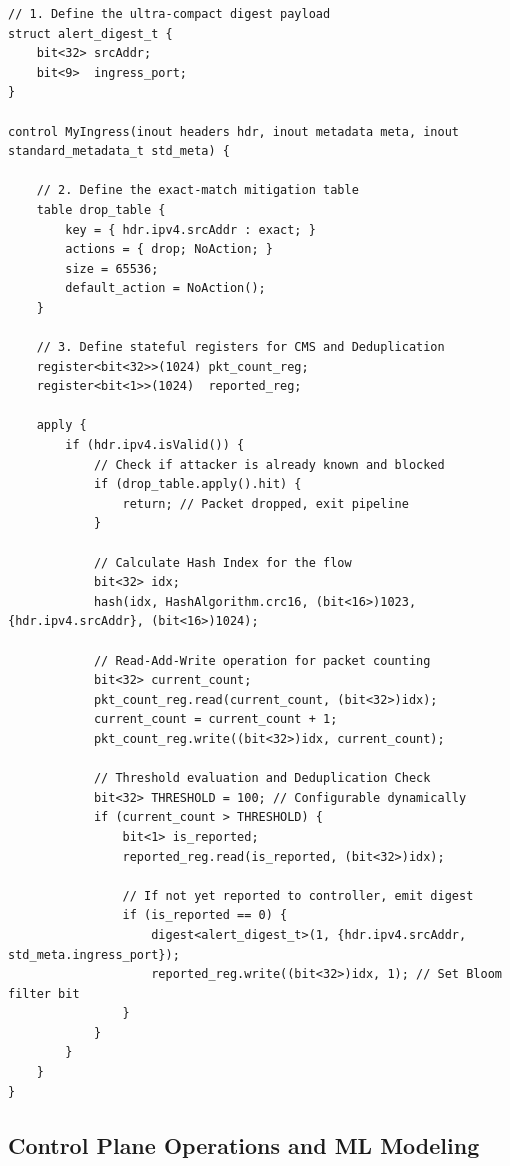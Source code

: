 \documentclass[sigconf, nonacm]{acmart}
\begin{document}
\begin{lstlisting}[caption={Updated P4-16 Implementation for Ingress Filtering, Sketch Accounting, and Digest Emission}, label={lst:p4code}, float=h]
// 1. Define the ultra-compact digest payload
struct alert_digest_t {
    bit<32> srcAddr;
    bit<9>  ingress_port;
}

control MyIngress(inout headers hdr, inout metadata meta, inout standard_metadata_t std_meta) {
    
    // 2. Define the exact-match mitigation table
    table drop_table {
        key = { hdr.ipv4.srcAddr : exact; }
        actions = { drop; NoAction; }
        size = 65536;
        default_action = NoAction();
    }

    // 3. Define stateful registers for CMS and Deduplication
    register<bit<32>>(1024) pkt_count_reg;
    register<bit<1>>(1024)  reported_reg;

    apply {
        if (hdr.ipv4.isValid()) {
            // Check if attacker is already known and blocked
            if (drop_table.apply().hit) {
                return; // Packet dropped, exit pipeline
            }

            // Calculate Hash Index for the flow
            bit<32> idx;
            hash(idx, HashAlgorithm.crc16, (bit<16>)1023, {hdr.ipv4.srcAddr}, (bit<16>)1024);

            // Read-Add-Write operation for packet counting
            bit<32> current_count;
            pkt_count_reg.read(current_count, (bit<32>)idx);
            current_count = current_count + 1;
            pkt_count_reg.write((bit<32>)idx, current_count);

            // Threshold evaluation and Deduplication Check
            bit<32> THRESHOLD = 100; // Configurable dynamically
            if (current_count > THRESHOLD) {
                bit<1> is_reported;
                reported_reg.read(is_reported, (bit<32>)idx);
                
                // If not yet reported to controller, emit digest
                if (is_reported == 0) {
                    digest<alert_digest_t>(1, {hdr.ipv4.srcAddr, std_meta.ingress_port});
                    reported_reg.write((bit<32>)idx, 1); // Set Bloom filter bit
                }
            }
        }
    }
}
\end{lstlisting}

\subsection{Control Plane Operations and ML Modeling}
\end{document}
